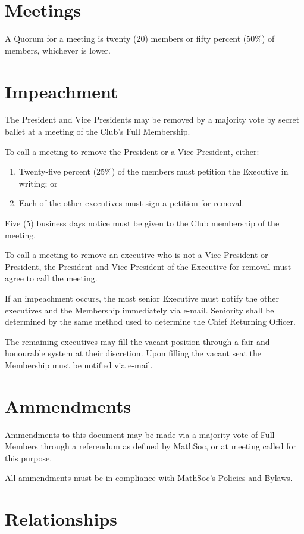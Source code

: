 \documentclass[11pt]{mathsoc}
\begin{document}
\section{Meetings}
A Quorum for a meeting is twenty (20) members or fifty percent (50\%) of 
members, whichever is lower.

\section{Impeachment}
The President and Vice Presidents may be removed by a majority vote by 
secret ballet at a meeting of the Club's Full Membership.

To call a meeting to remove the President or a Vice-President, either:
\begin{enumerate}
    \item Twenty-five percent (25\%) of the members must petition the 
        Executive in writing; or
    \item Each of the other executives must sign a petition for removal. 
\end{enumerate}

Five (5) business days notice must be given to the Club membership of the
meeting. 

To call a meeting to remove an executive who is not a Vice President or 
President, the President and Vice-President of the Executive for removal must 
agree to call the meeting.

If an impeachment occurs, the most senior Executive must notify the other 
executives and the Membership immediately via e-mail. Seniority shall be 
determined by the same method used to determine the Chief Returning
Officer.

The remaining executives may fill the vacant position through a fair and 
honourable system at their discretion. Upon filling the vacant seat the 
Membership must be notified via e-mail.

\section{Ammendments}
Ammendments to this document may be made via a majority vote of Full Members 
through a referendum as defined by MathSoc, or at meeting called for this purpose.  

All ammendments must be in compliance with MathSoc's Policies and Bylaws.

\section{Relationships}
\end{document}
